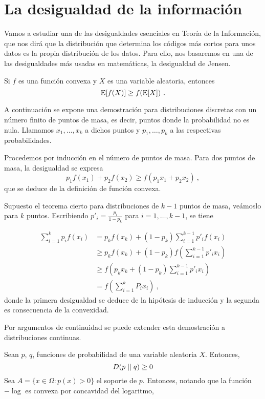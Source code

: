 \section{La desigualdad de la
información}\label{la-desigualdad-de-la-informaciuxf3n}

Vamos a estudiar una de las desigualdades esenciales en Teoría de la
Información, que nos dirá que la distribución que determina los códigos
más cortos para unos datos es la propia distribución de los datos. Para
ello, nos basaremos en una de las desigualdades más usadas en
matemáticas, la desigualdad de Jensen.

Si \(f\) es una función convexa y \(X\) es una variable aleatoria,
entonces \[\mathrm{E}[f(X)]\geq f(\mathrm{E}[X])~.\]

\proofb
A continuación se expone una demostración para distribuciones discretas
con un número finito de puntos de masa, es decir, puntos donde la
probabilidad no es nula. Llamamos \(x_1, \dots, x_k\) a dichos puntos y
\(p_1, \dots, p_k\) a las respectivas probabilidades.

Procedemos por inducción en el número de puntos de masa. Para dos puntos
de masa, la desigualdad se expresa
\[p_1f(x_1)+p_2f(x_2)\geq f(p_1x_1+p_2x_2)~,\] que se deduce de la
definición de función convexa.

Supuesto el teorema cierto para distribuciones de \(k-1\) puntos de
masa, veámoslo para \(k\) puntos. Escribiendo
\(p'_{i}=\frac{p_{i}}{1-p_k}\) para \(i=1,\dots,k-1\), se tiene

\begin{align*}
  \sum_{i=1}^kp_if(x_i)&=p_kf(x_k)+(1-p_k)\sum_{i=1}^{k-1}p'_if(x_i)\\
                       &\geq p_kf(x_k)+(1-p_k)f\left(\sum_{i=1}^{k-1}p'_ix_i\right)\\
                       &\geq f\left(p_kx_k+(1-p_k) \sum_{i=1}^{k-1}p'_ix_i\right)\\
                       &=f\left(\sum_{i=1}^kP_ix_i\right)~,  
\end{align*}
donde la primera desigualdad se deduce de la hipótesis de inducción y la
segunda es consecuencia de la convexidad.

Por argumentos de continuidad se puede extender esta demostración a
distribuciones continuas. \proofe
\theoe

\label{th:information-ineq}
Sean \(p\), \(q\), funciones de probabilidad de una variable aleatoria
\(X\). Entonces, \[D(p\mid\mid q)\geq 0\] \proofb
Sea \(A=\{x\in\Omega :p(x)>0\}\) el soporte de \(p\). Entonces, notando
que la función \(-\log\) es convexa por concavidad del logaritmo,

